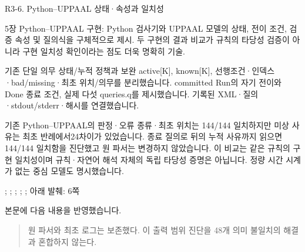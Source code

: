\begin{reviewitem}{R3-6. Python–UPPAAL 상태·속성과 일치성}

\begin{reviewercomment}

5장 Python–UPPAAL 구현: Python 검사기와 UPPAAL 모델의 상태, 전이 조건, 검증 속성 및 질의식을 구체적으로 제시. 두 구현의 결과 비교가 규칙의 타당성 검증이 아니라 구현 일치성 확인이라는 점도 더욱 명확히 기술.

\end{reviewercomment}

\begin{authorresponse}

기존 단일 의무 상태/누적 정책과 보완 active[K], known[K], 선행조건·인덱스·bad/missing·최초 위치/의무를 분리했습니다. committed Run의 자기 전이와 Done 종료 조건, 실제 다섯 queries.q를 제시했습니다. 기록된 XML·질의·stdout/stderr·해시를 연결했습니다.

기존 Python–UPPAAL의 판정·오류 종류·최초 위치는 144/144 일치하지만 미상 사유는 최초 반례에서24차이가 있었습니다. 종료 질의로 뒤의 누적 사유까지 읽으면144/144 일치함을 진단했고 원 파서는 변경하지 않았습니다. 이 비교는 같은 규칙의 구현 일치성이며 규칙·자연어 해석 자체의 독립 타당성 증명은 아닙니다. 정량 시간 시계가 없는 중심 모델도 명시했습니다.

\end{authorresponse}

\begin{manuscriptrevision}{; ; ; ; ; 아래 발췌: 6쪽}

본문에 다음 내용을 반영했습니다.

\begin{quote}

원 파서와 최초 로그는 보존했다. 이 출력 범위 진단을 48개 의미 불일치의 해결과 혼합하지 않는다.

\end{quote}

\end{manuscriptrevision}

\end{reviewitem}

\clearpage

